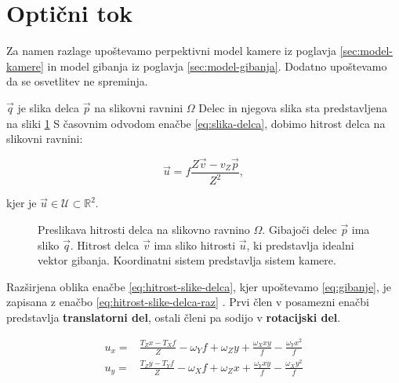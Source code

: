 \section{Optični tok} \label{sec:opticni-tok}
Za namen razlage upoštevamo perpektivni model kamere iz poglavja \ref{sec:model-kamere} in model gibanja iz poglavja \ref{sec:model-gibanja}. Dodatno upoštevamo da se osvetlitev ne spreminja.

$\vec{q}$ je slika delca $\vec{p}$ na slikovni ravnini $\mathit{\Omega}$ Delec in njegova slika sta predstavljena na sliki \ref{fig:optical-flow} S časovnim odvodom enačbe \eqref{eq:slika-delca}, dobimo hitrost delca na slikovni ravnini:

\begin{equation}\label{eq:hitrost-slike-delca}
	\vec{u} = f \frac{Z\vec{v}-v_Z\vec{p}}{Z^2},
\end{equation}

kjer je $\vec{u} \in \mathcal{U} \subset \mathbb{R}^2$.




\begin{figure}[htb]
\centering

\caption[Preslikava hitrosti delca na slikovno ravnino $\mathit{\Omega}$]{ Preslikava hitrosti delca na slikovno ravnino $\mathit{\Omega}$. Gibajoči delec $\vec{p}$ ima sliko $\vec{q}$. Hitrost delca $\vec{v}$ ima sliko hitrosti $\vec{u}$, ki predstavlja idealni vektor gibanja. Koordinatni sistem predstavlja sistem kamere.}
\label{fig:optical-flow}
\end{figure}




Razširjena oblika enačbe \eqref{eq:hitrost-slike-delca}, kjer upoštevamo \eqref{eq:gibanje}, je zapisana z enačbo \eqref{eq:hitrost-slike-delca-raz} \cite{trucco1998introductory}. Prvi člen v posamezni enačbi predstavlja \textbf{translatorni del}, ostali členi pa sodijo v \textbf{rotacijski del}.

\begin{equation}\label{eq:hitrost-slike-delca-raz}
\begin{aligned}
	u_x = & \frac{T_Z x - T_X f}{Z} - \omega_Y f + \omega_Z y + \frac{\omega_X x y}{f} - \frac{\omega_Y x^2}{f} \\
    u_y = & \frac{T_Z y - T_Y f}{Z} - \omega_X f + \omega_Z x + \frac{\omega_Y x y}{f} - \frac{\omega_X y^2}{f}
\end{aligned}
\end{equation}

